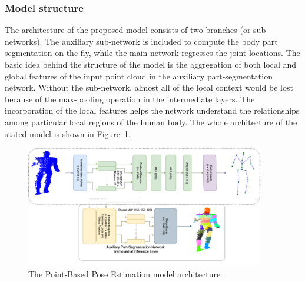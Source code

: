 \subsubsection{Model structure}
The architecture of the proposed model consists of two branches (or sub-networks). The auxiliary sub-network is included to compute the body part segmentation on the fly, while the main network regresses the joint locations. The basic idea behind the structure of the model is the aggregation of both local and global features of the input point cloud in the auxiliary part-segmentation network. Without the sub-network, almost all of the local context would be lost because of the max-pooling operation in the intermediate layers. The incorporation of the local features helps the network understand the relationships among particular local regions of the human body. The whole architecture of the stated model is shown in Figure~\ref{fig:PBPE}.\par
\vspace{5mm}

\begin{figure}[H]
\begin{center}
  \includegraphics[height=200px]{images/implementation/pbpe2.PNG}
  \caption[The Point-Based Pose Estimation model architecture.]{The Point-Based Pose Estimation model architecture~\cite{Ali19}.}
  \label{fig:PBPE}
\end{center}
\end{figure}

